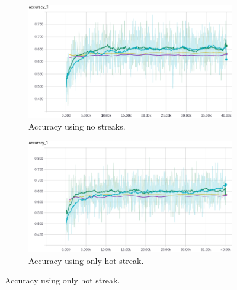\documentclass{article} %
\begin{document}
\begin{figure}[!htb]
  \begin{subfigure}{0.5\textwidth}
    \includegraphics[width=\linewidth]{plots/model1/pairwise-matchups/streak-/accuracy.png}
    \caption{Accuracy using no streaks.}\label{fig:pairwise-matchups--accuracy}
  \end{subfigure}
  \begin{subfigure}{0.5\textwidth}
    \includegraphics[width=\linewidth]{plots/model1/pairwise-matchups/streak-h/accuracy.png}
    \caption{Accuracy using only hot streak.}\label{fig:pairwise-matchups-h-accuracy}
  \end{subfigure}



\end{figure}
\end{document}
